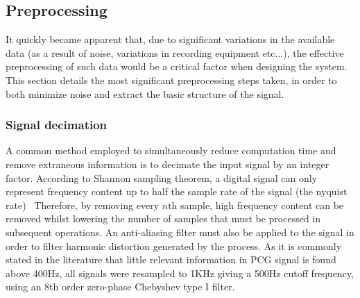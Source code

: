 \documentclass[titlepage, 12pt]{scrartcl} \usepackage{enumitem}
\begin{document}

\subsection{Preprocessing}\label{preprocessing}
It quickly became apparent that, due to significant variations in the available
data (as a result of noise, variations in recording equipment etc...), the
effective preprocessing of such data would be a critical factor when designing
the system. This section details the most significant preprocessing steps
taken, in order to both minimize noise and extract the basic structure of the
signal.

\subsubsection{Signal decimation}
A common method employed to simultaneously reduce computation time and remove
extraneous information is to decimate the input signal by an integer factor.
According to Shannon sampling theorem, a digital signal can only represent
frequency content up to half the sample rate of the signal (the nyquist
rate)~\parencite[p.140]{Kadis1999}
Therefore, by removing every $n$th sample, high frequency content can be
removed whilst lowering the number of samples that must be processed in
subsequent operations. An anti-aliasing filter must also be applied to the
signal in order to filter harmonic distortion generated by the process.
As it is commonly stated in the literature that little relevant information in
PCG signal is found above 400Hz, all signals were resampled to 1KHz giving a
500Hz cutoff frequency, using an 8th order zero-phase Chebyshev type I filter.
\end{document}
